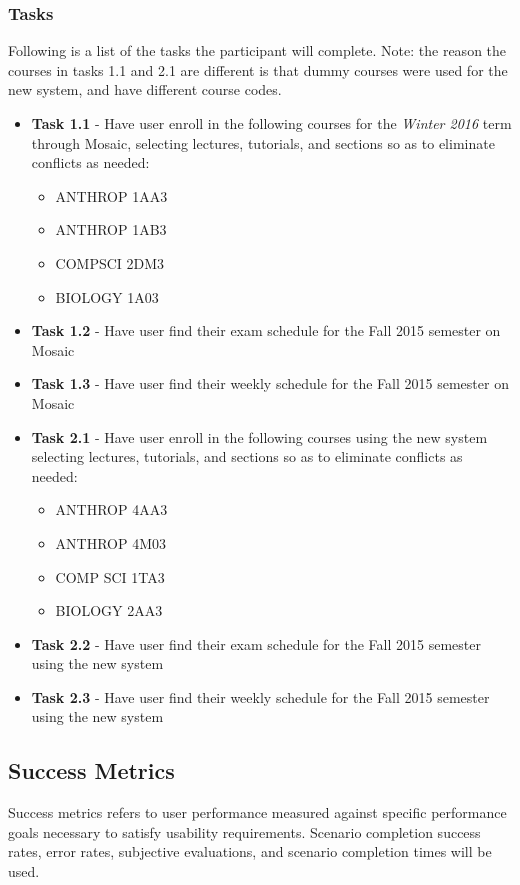 \documentclass[10pt]{article}
\begin{document}
\begin{multicols}{2}
\subsubsection*{Tasks}
Following is a list of the tasks the participant will complete. Note: the reason the courses in tasks 1.1 and 2.1 are different is that dummy courses were used for the new system, and have different course codes.
\begin{itemize}
\item \textbf{Task 1.1} - Have user enroll in the following courses for the \emph{Winter 2016} term through Mosaic, selecting lectures, tutorials, and sections so as to eliminate conflicts as needed:
\begin{itemize}
\item ANTHROP 1AA3
\item ANTHROP 1AB3
\item COMPSCI 2DM3
\item BIOLOGY 1A03
\end{itemize}
\item \textbf{Task 1.2} - Have user find their exam schedule for the Fall 2015 semester on Mosaic 
\item \textbf{Task 1.3} - Have user find their weekly schedule for the Fall 2015 semester on Mosaic
\item \textbf{Task 2.1} -  Have user enroll in the following courses using the new system selecting lectures, tutorials, and sections so as to eliminate conflicts as needed:
\begin{itemize}
\item ANTHROP 4AA3
\item ANTHROP 4M03
\item COMP SCI 1TA3
\item BIOLOGY 2AA3
\end{itemize}
\item \textbf{Task 2.2} - Have user find their exam schedule for the Fall 2015 semester using the new system
\item \textbf{Task 2.3} - Have user find their weekly schedule for the Fall 2015 semester using the new system
\end{itemize}

\subsection*{Success Metrics}
Success metrics refers to user performance measured against specific performance goals necessary to satisfy usability requirements. Scenario completion success rates, error rates, subjective evaluations, and scenario completion times will be used.


\end{multicols}
\end{document}
